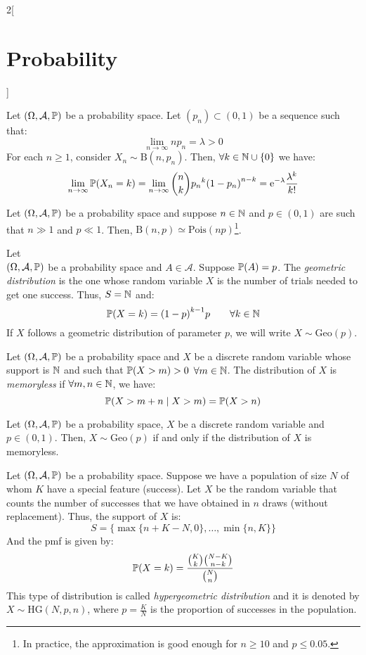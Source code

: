 \documentclass[../../../main.tex]{subfiles}
\begin{document}
\begin{multicols}{2}[\section{Probability}]
\begin{definition}
    \end{definition}
    \begin{theorem}
        Let $(\Omega,\mathcal{A},\mathbb{P})$ be a probability space. Let $(p_n)\subset(0,1)$ be a sequence such that: $$\lim_{n\to\infty}np_n=\lambda>0$$
        For each $n\geq 1$, consider $X_n\sim \text{B}(n,p_n)$. Then, $\forall k\in\mathbb{N}\cup\{0\}$ we have: $$\lim_{n\to\infty}\mathbb{P}(X_n=k)=\lim_{n\to\infty}\binom{n}{k}{p_n}^k{(1-p_n)}^{n-k}=\mathrm{e}^{-\lambda}\frac{\lambda^k}{k!}$$
    \end{theorem}
    \begin{corollary}
        Let $(\Omega,\mathcal{A},\mathbb{P})$ be a probability space and suppose $n\in\mathbb{N}$ and $p\in (0,1)$ are such that $n\gg 1$ and $p\ll 1$. Then, $\text{B}(n,p)\simeq\text{Pois}(np)$\footnote{In practice, the approximation is good enough for $n\geq 10$ and $p\leq 0.05$.}.
    \end{corollary}
    \begin{definition}
        Let\\ $(\Omega,\mathcal{A},\mathbb{P})$ be a probability space and $A\in\mathcal{A}$. Suppose $\mathbb{P}(A)=p$. The \textit{geometric distribution} is the one whose random variable $X$ is the number of trials needed to get one success. Thus, $S=\mathbb{N}$ and: $$\mathbb{P}(X=k)={(1-p)}^{k-1}p\qquad \forall k\in\mathbb{N}$$ If $X$ follows a geometric distribution of parameter $p$, we will write $X\sim \text{Geo}(p)$.
    \end{definition}
    \begin{definition}
        Let $(\Omega,\mathcal{A},\mathbb{P})$ be a probability space and $X$ be a discrete random variable whose support is $\mathbb{N}$ and such that $\mathbb{P}(X >m)>0$ $\forall m\in\mathbb{N}$. The distribution of $X$ is \textit{memoryless} if $\forall m,n\in\mathbb{N}$, we have: $$\mathbb{P}(X>m+n\mid X >m)=\mathbb{P}(X>n)$$
    \end{definition}
    \begin{prop}
        Let $(\Omega,\mathcal{A},\mathbb{P})$ be a probability space, $X$ be a discrete random variable and $p\in(0,1)$. Then, $X\sim\text{Geo}(p)$ if and only if the distribution of $X$ is memoryless.
    \end{prop}
    \begin{definition}
        Let $(\Omega,\mathcal{A},\mathbb{P})$ be a probability space. Suppose we have a population of size $N$ of whom $K$ have a special feature (success). Let $X$ be the random variable that counts the number of successes that we have obtained in $n$ draws (without replacement). Thus, the support of $X$ is: $$S=\{\max\{n+K-N,0\},\ldots,\min\{n,K\}\}$$ And the pmf is given by: $$\mathbb{P}(X=k)=\frac{\binom{K}{k}\binom{N-K}{n-k}}{\binom{N}{n}}$$ This type of distribution is called \textit{hypergeometric distribution} and it is denoted by $X\sim \text{HG}(N,p,n)$, where $p=\frac{K}{N}$ is the proportion of successes in the population.

\end{definition}
\end{multicols}
\end{document}
